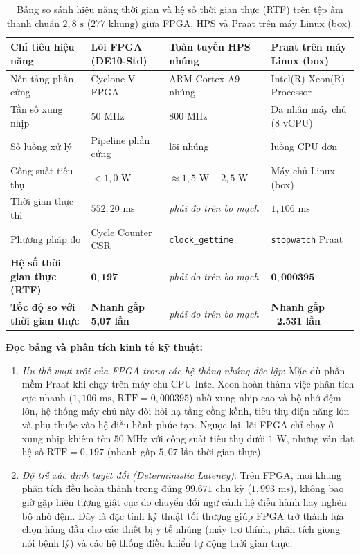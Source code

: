 \begin{table}[htbp]
\centering
\caption{Bảng so sánh hiệu năng thời gian và hệ số thời gian thực (RTF) trên tệp âm thanh chuẩn $2{,}8\text{ s}$ ($277\text{ khung}$) giữa FPGA, HPS và Praat trên máy Linux (box).}
\label{tab:ch13_timing_comparison}
\small
\begin{tabularx}{\linewidth}{>{\raggedright\arraybackslash}p{4.0cm}>{\centering\arraybackslash}X>{\centering\arraybackslash}X>{\centering\arraybackslash}X}
\toprule
\textbf{Chỉ tiêu hiệu năng} & \textbf{Lõi FPGA (DE10-Std)} & \textbf{Toàn tuyến HPS nhúng} & \textbf{Praat trên máy Linux (box)} \\
\midrule
Nền tảng phần cứng & Cyclone V FPGA & ARM Cortex-A9 nhúng & Intel(R) Xeon(R) Processor \\
Tần số xung nhịp & $50\text{ MHz}$ & $800\text{ MHz}$ & Đa nhân máy chủ ($8\text{ vCPU}$) \\
Số luồng xử lý & Pipeline phần cứng & 1 lõi nhúng & 1 luồng CPU đơn \\
Công suất tiêu thụ & $< 1{,}0\text{ W}$ & $\approx 1{,}5\text{ W} - 2{,}5\text{ W}$ & Máy chủ Linux (box) \\
\midrule
Thời gian thực thi & $552{,}20\text{ ms}$ & \emph{phải đo trên bo mạch} & $1{,}106\text{ ms}$ \\
Phương pháp đo & Cycle Counter CSR & \texttt{clock\_gettime} & \texttt{stopwatch} Praat \\
\textbf{Hệ số thời gian thực (RTF)} & $\mathbf{0{,}197}$ & \emph{phải đo trên bo mạch} & $\mathbf{0{,}000395}$ \\
\textbf{Tốc độ so với thời gian thực} & \textbf{Nhanh gấp 5,07 lần} & \emph{phải đo trên bo mạch} & \textbf{Nhanh gấp ~2.531 lần} \\
\bottomrule
\end{tabularx}
\end{table}

\textbf{Đọc bảng và phân tích kinh tế kỹ thuật:}
\begin{enumerate}
    \item \emph{Ưu thế vượt trội của FPGA trong các hệ thống nhúng độc lập}: Mặc dù phần mềm Praat khi chạy trên máy chủ CPU Intel Xeon hoàn thành việc phân tích cực nhanh ($1{,}106\text{ ms}$, $\text{RTF} = 0{,}000395$) nhờ xung nhịp cao và bộ nhớ đệm lớn, hệ thống máy chủ này đòi hỏi hạ tầng cồng kềnh, tiêu thụ điện năng lớn và phụ thuộc vào hệ điều hành phức tạp. Ngược lại, lõi FPGA chỉ chạy ở xung nhịp khiêm tốn $50\text{ MHz}$ với công suất tiêu thụ dưới $1\text{ W}$, nhưng vẫn đạt hệ số $\text{RTF} = 0{,}197$ (nhanh gấp $5{,}07\text{ lần}$ thời gian thực).
    \item \emph{Độ trễ xác định tuyệt đối (Deterministic Latency)}: Trên FPGA, mọi khung phân tích đều hoàn thành trong đúng $99.671\text{ chu kỳ}$ ($1{,}993\text{ ms}$), không bao giờ gặp hiện tượng giật cục do chuyển đổi ngữ cảnh hệ điều hành hay nghẽn bộ nhớ đệm. Đây là đặc tính kỹ thuật tối thượng giúp FPGA trở thành lựa chọn hàng đầu cho các thiết bị y tế nhúng (máy trợ thính, phân tích giọng nói bệnh lý) và các hệ thống điều khiển tự động thời gian thực.
\end{enumerate}

